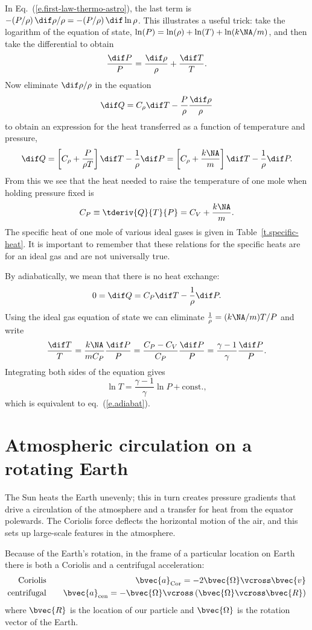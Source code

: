 \begin{sidebar}
In Eq.~(\ref{e.first-law-thermo-astro}), the last term is $-(P/\rho)\, \dif\rho/\rho = -(P/\rho)\,\dif\ln\rho$. This illustrates a useful trick: take the logarithm of the equation of state, $\ln (P) = \ln(\rho) + \ln (T) + \ln (k\NA/m)$, and then take the differential to obtain
\[ \frac{\dif P}{P} = \frac{\dif\rho}{\rho} + \frac{\dif T}{T}. \]
Now eliminate $\dif\rho/\rho$ in the equation
\[ \dif Q = C_{\rho}\dif T - \frac{P}{\rho}\frac{\dif\rho}{\rho} \]
to obtain an expression for the heat transferred as a function of temperature and pressure,
\[ \dif Q = \left[C_{\rho} + \frac{P}{\rho T}\right]\dif T - \frac{1}{\rho}\dif P
	 = \left[C_{\rho} + \frac{k\NA}{m}\right]\dif T - \frac{1}{\rho}\dif P. \]
From this we see that the heat needed to raise the temperature of one mole when holding pressure fixed is
\begin{equation}\label{e.CP}
C_{P}\equiv \tderiv{Q}{T}{P} = C_{V} + \frac{k\NA}{m}.
\end{equation}
The specific heat of one mole of various ideal gases is given in Table~\ref{t.specific-heat}.
It is important to remember that these relations for the specific heats are for an ideal gas and are not universally true.

  By adiabatically, we mean that there is no heat exchange:
\[ 0 = \dif Q = C_{P}\dif T - \frac{1}{\rho} \dif P.\]
Using the ideal gas equation of state we can eliminate $\frac{1}{\rho} = (k\NA/m) T/P$ and write
\[ \frac{\dif T}{T} = \frac{k\NA}{mC_{P}} \frac{\dif P}{P} = \frac{C_{P}-C_{V}}{C_{P}} \frac{\dif P}{P} = \frac{\gamma-1}{\gamma}\frac{\dif P}{P}. \]
Integrating both sides of the equation gives
\[ \ln T = \frac{\gamma-1}{\gamma}\ln P + \textrm{const.},\]
which is equivalent to eq.~(\ref{e.adiabat}).
\end{sidebar}

\section{Atmospheric circulation on a rotating Earth}\label{s.motion-in-atmosphere}

The Sun heats the Earth unevenly; this in turn creates pressure gradients that drive a circulation of the atmosphere and a transfer for heat from the equator polewards.  The Coriolis force deflects the horizontal motion of the air, and this sets up large-scale features in the atmosphere.

Because of the Earth's rotation, in the frame of a particular location on Earth there is both a Coriolis and a centrifugal acceleration:
\begin{eqnarray}
\textrm{Coriolis} &\quad& \bvec{a}_{\mathrm{Cor}} = -2\bvec{\Omega}\vcross\bvec{v}\\
\textrm{centrifugal} &\quad& \bvec{a}_{\mathrm{cen}} = -\bvec{\Omega}\vcross\left(\bvec{\Omega}\vcross\bvec{R}\right)
\end{eqnarray}
where $\bvec{R}$ is the location of our particle and $\bvec{\Omega}$ is the rotation vector of the Earth.  

